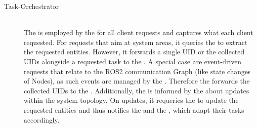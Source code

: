 \begin{description}
        \item[Task-Orchestrator] \hfill \\
        The  is employed by the  for all client requests and captures what each client requested. For requests that aim at system areas, it queries the  to extract the requested entities. However, it forwards a single UID or the collected UIDs alongside a requested task to the . A special case are event-driven requests that relate to the ROS2 communication Graph (like state changes of Nodes), as such events are managed by the . Therefore the  forwards the collected UIDs to the .\newline
        Additionally, the  is informed by the  a\-bout updates within the system topology. On updates, it requeries the  to update the requested entities and thus notifies the  and the , which adapt their tasks accordingly.


\end{description}
